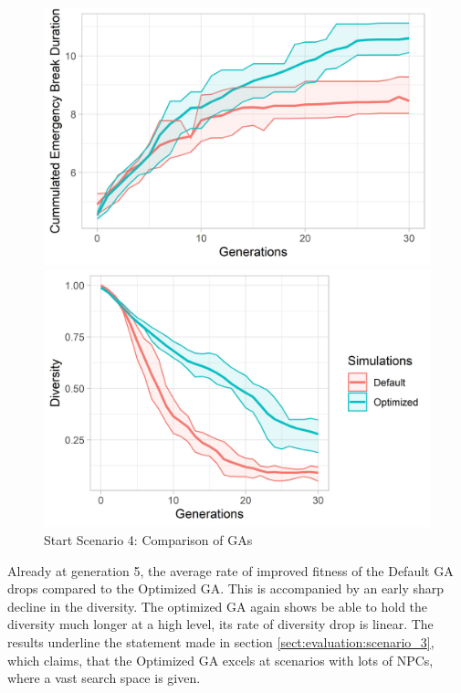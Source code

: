 \begin{figure}[ht] 
	\label{fig:evaluation:sim_4_ga_comparison}
	\begin{minipage}[b]{0.5\linewidth}
		\centering
		\includegraphics[width=1\linewidth]{simulations/evaluation/plots/sim_4_ga_generations} 
	\end{minipage}%
	\begin{minipage}[b]{0.5\linewidth}
		\centering
		\includegraphics[width=1\linewidth]{simulations/evaluation/plots/sim_4_ga_diversity} 
	\end{minipage} 
	\caption{Start Scenario 4: Comparison of GAs}
\end{figure}


Already at generation 5, the average rate of improved fitness of the Default GA drops compared to the Optimized GA. This is accompanied by an early sharp decline in the diversity. The optimized GA again shows be able to hold the diversity much longer at a high level, its rate of diversity drop is linear.
The results underline the statement made in section \ref{sect:evaluation:scenario_3}, which claims, that the Optimized GA excels at scenarios with lots of NPCs, where a vast search space is given.



